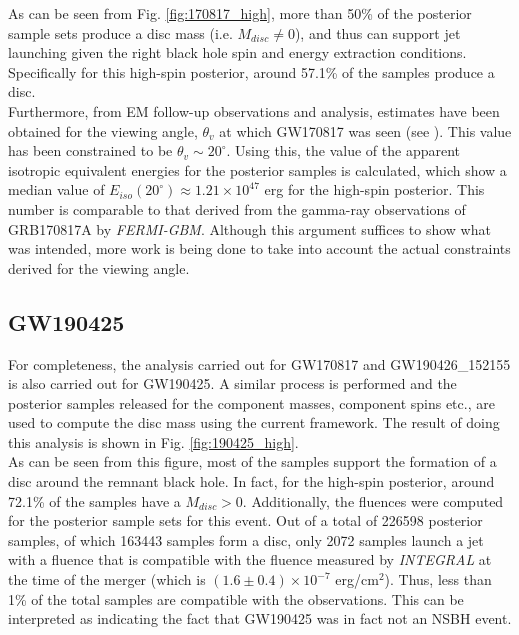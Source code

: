     As can be seen from Fig. \ref{fig:170817_high}, more than 50\% of the posterior
    sample sets produce a disc mass (i.e. $M_{disc} \neq 0$), and thus can support jet
    launching given the right black hole spin and energy extraction conditions.
    Specifically for this high-spin posterior, around 57.1\% of the samples produce a
    disc.\\
    Furthermore, from EM follow-up observations and analysis, estimates have been
    obtained for the viewing angle, $\theta_v$ at which GW170817 was seen (see
    \cite{finstad_2018}). This value has been constrained to be $\theta_v \sim
    20^{\circ}$. Using this, the value of the apparent isotropic equivalent energies for
    the posterior samples is calculated, which show a median value of
    $E_{iso}(20^{\circ}) \approx 1.21 \times 10^{47}$ erg for the high-spin posterior.
    This number is comparable to that derived from the gamma-ray observations of
    GRB170817A by \textit{FERMI-GBM}. Although this argument suffices to show what was
    intended, more work is being done to take into account the actual constraints
    derived for the viewing angle.

    \subsection{GW190425}\label{ssec:nsbh_190425}

        For completeness, the analysis carried out for GW170817 and GW190426\_152155 is
        also carried out for GW190425. A similar process is performed and the
        posterior samples released for the component masses, component spins etc., are
        used to compute the disc mass using the current framework. The result of doing
        this analysis is shown in Fig. \ref{fig:190425_high}.\\
        As can be seen from this figure, most of the samples support the formation of a
        disc around the remnant black hole. In fact, for the high-spin posterior, around
        72.1\% of the samples have a $M_{disc} > 0$. Additionally, the fluences were
        computed for the posterior sample sets for this event. Out of a total of 226598
        posterior samples, of which 163443 samples form a disc, only 2072 samples launch
        a jet with a fluence that is compatible with the fluence measured by
        \textit{INTEGRAL} at the time of the merger (which is $(1.6 \pm 0.4) \times
        10^{-7}$ erg/cm$^2$). Thus, less than 1\% of the total samples are compatible
        with the observations. This can be interpreted as indicating the fact that
        GW190425 was in fact not an NSBH event.\\

